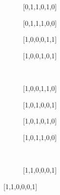 \begin{figure}
\begin{subfigure}{0.25\columnwidth}\centering{}\vspace{-1.5mm}\caption{[0,1,1,0,1,0]}\vspace{1.5mm}\end{subfigure}\hfill
\begin{subfigure}{0.25\columnwidth}\centering{}\vspace{-1.5mm}\caption{[0,1,1,1,0,0]}\vspace{1.5mm}\end{subfigure}\hfill
\begin{subfigure}{0.25\columnwidth}\centering{}\vspace{-1.5mm}\caption{[1,0,0,0,1,1]}\vspace{1.5mm}\end{subfigure}\hfill
\begin{subfigure}{0.25\columnwidth}\centering{}\vspace{-1.5mm}\caption{[1,0,0,1,0,1]}\vspace{1.5mm}\end{subfigure}\\
\begin{subfigure}{0.25\columnwidth}\centering{}\vspace{-1.5mm}\caption{[1,0,0,1,1,0]}\vspace{1.5mm}\label{fig:layouts8x8:100110}\end{subfigure}\hfill
\begin{subfigure}{0.25\columnwidth}\centering{}\vspace{-1.5mm}\caption{[1,0,1,0,0,1]}\vspace{1.5mm}\end{subfigure}\hfill
\begin{subfigure}{0.25\columnwidth}\centering{}\vspace{-1.5mm}\caption{[1,0,1,0,1,0]}\vspace{1.5mm}\end{subfigure}\hfill
\begin{subfigure}{0.25\columnwidth}\centering{}\vspace{-1.5mm}\caption{[1,0,1,1,0,0]}\vspace{1.5mm}\end{subfigure}\\
\begin{subfigure}{0.25\columnwidth}\centering{}\vspace{-1.5mm}\caption{[1,1,0,0,0,1]}\vspace{1.5mm}\end{subfigure}\hfill

\end{figure}
